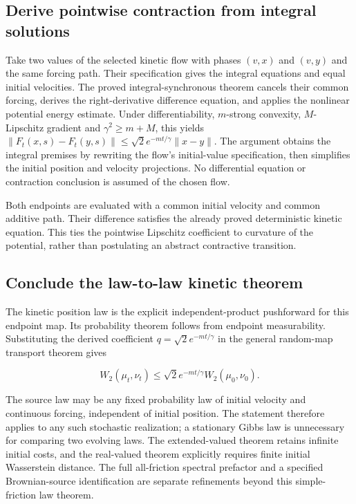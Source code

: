 \documentclass[11pt,a4paper]{report}
\begin{document}
\subsection{\texorpdfstring{Derive pointwise contraction from integral solutions}{Derive pointwise contraction from integral solutions}}
\label{report-step-KineticLangevin-FlowLaw-lean-5}


Take two values of the selected kinetic flow with phases \((v,x)\) and \((v,y)\) and the same forcing path. Their specification gives the integral equations and equal initial velocities. The proved integral-synchronous theorem cancels their common forcing, derives the right-derivative difference equation, and applies the nonlinear potential energy estimate. Under differentiability, \(m\)-strong convexity, \(M\)-Lipschitz gradient and \(\gamma^2\ge m+M\), this yields \(\|F_t(x,s)-F_t(y,s)\|\le\sqrt2e^{-mt/\gamma}\|x-y\|\). The argument obtains the integral premises by rewriting the flow's initial-value specification, then simplifies the initial position and velocity projections. No differential equation or contraction conclusion is assumed of the chosen flow.



Both endpoints are evaluated with a common initial velocity and common additive path. Their difference satisfies the already proved deterministic kinetic equation. This ties the pointwise Lipschitz coefficient to curvature of the potential, rather than postulating an abstract contractive transition.

\subsection{\texorpdfstring{Conclude the law-to-law kinetic theorem}{Conclude the law-to-law kinetic theorem}}
\label{report-step-KineticLangevin-FlowLaw-lean-6}


The kinetic position law is the explicit independent-product pushforward for this endpoint map. Its probability theorem follows from endpoint measurability. Substituting the derived coefficient \(q=\sqrt2e^{-mt/\gamma}\) in the general random-map transport theorem gives

\[W_2(\mu_t,\nu_t)\le\sqrt2e^{-mt/\gamma}W_2(\mu_0,\nu_0).\]

The source law may be any fixed probability law of initial velocity and continuous forcing, independent of initial position. The statement therefore applies to any such stochastic realization; a stationary Gibbs law is unnecessary for comparing two evolving laws. The extended-valued theorem retains infinite initial costs, and the real-valued theorem explicitly requires finite initial Wasserstein distance. The full all-friction spectral prefactor and a specified Brownian-source identification are separate refinements beyond this simple-friction law theorem.
\end{document}
